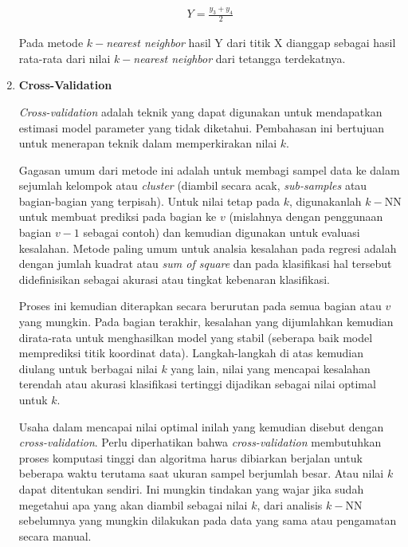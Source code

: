 \begin{enumerate}[label=\textbf{\alph*).}]
	\begin{equation}\label{eq: KNN_regresi_mean}
	\begin{split}
	Y = \frac{y_{3} + y_{4}}{2}
	\end{split}
	\end{equation}
	
	Pada metode $k-$\textit{nearest neighbor} hasil Y dari titik X dianggap sebagai hasil rata-rata dari nilai $k-$\textit{nearest neighbor} dari tetangga terdekatnya.
	\vspace{1ex}
	
	\item \textbf{Cross-Validation}
	
	\textit{Cross-validation} adalah teknik yang dapat digunakan untuk mendapatkan estimasi model parameter yang tidak diketahui. Pembahasan ini bertujuan untuk menerapan teknik dalam memperkirakan nilai $k$. 
	\vspace{1ex}
	
	Gagasan umum dari metode ini adalah untuk membagi sampel data ke dalam sejumlah kelompok atau \textit{cluster} (diambil secara acak, \textit{sub-samples} atau bagian-bagian yang terpisah). Untuk nilai tetap pada $k$, digunakanlah $k-$NN untuk membuat prediksi pada bagian ke $v$ (mislahnya dengan penggunaan bagian $v-1$ sebagai contoh) dan kemudian digunakan untuk evaluasi kesalahan. Metode paling umum untuk analsia kesalahan pada regresi adalah dengan jumlah kuadrat atau \textit{sum of square} dan pada klasifikasi hal tersebut didefinisikan sebagai akurasi atau tingkat kebenaran klasifikasi.
	\vspace{1ex}
	
	Proses ini kemudian diterapkan secara berurutan pada semua bagian atau $v$ yang mungkin. Pada bagian terakhir, kesalahan yang dijumlahkan kemudian dirata-rata untuk menghasilkan model yang stabil (seberapa baik model memprediksi titik koordinat data). Langkah-langkah di atas kemudian diulang untuk berbagai nilai $k$ yang lain, nilai yang mencapai kesalahan terendah atau akurasi klasifikasi tertinggi dijadikan sebagai nilai optimal untuk $k$. 
	\vspace{1ex}
	
	Usaha dalam mencapai nilai optimal inilah yang kemudian disebut dengan \textit{cross-validation}. Perlu diperhatikan bahwa \textit{cross-validation} membutuhkan proses komputasi tinggi dan algoritma harus dibiarkan berjalan untuk beberapa waktu terutama saat ukuran sampel berjumlah besar. Atau nilai $k$ dapat ditentukan sendiri. Ini mungkin tindakan yang wajar jika sudah megetahui apa yang akan diambil sebagai nilai $k$, dari analisis $k-$NN sebelumnya yang mungkin dilakukan pada data yang sama atau pengamatan secara manual.
	

\end{enumerate}
